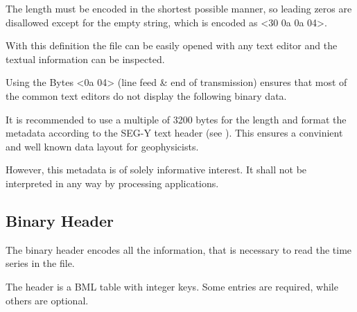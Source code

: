 \documentclass[DIV=10]{scrartcl}
\newcommand\litref[1]{\textref{[#1]}}
\begin{document}
The length must be encoded in the shortest possible manner, so leading zeros are disallowed except for the empty string, which is encoded as <30 0a 0a 04>.

With this definition the file can be easily opened with any text editor and the textual information can be inspected.

Using the Bytes <0a 04> (line feed \& end of transmission) ensures that most of the common text editors do not display the following binary data.

It is recommended to use a multiple of 3200 bytes for the length and format the metadata according to the SEG-Y text header (see \litref{Segy02}).
This ensures a convinient and well known data layout for geophysicists.

However, this metadata is of solely informative interest.
It shall not be interpreted in any way by processing applications.

\clearpage

\subsection{Binary Header}

The binary header encodes all the information, that is necessary to read the time series in the file.

The header is a BML table with integer keys.
Some entries are required, while others are optional.
\end{document}

